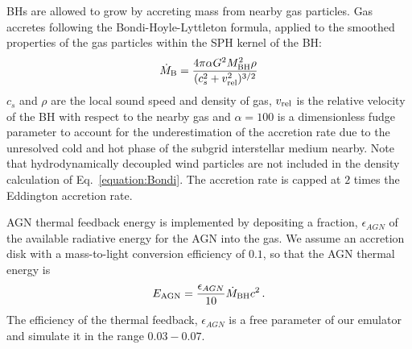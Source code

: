 \documentclass[a4paper,11pt]{article}
\begin{document}
BHs are allowed to grow by accreting mass from nearby gas particles. Gas accretes following the Bondi-Hoyle-Lyttleton formula, applied to the smoothed properties of the gas particles within the SPH kernel of the BH:
\begin{equation}
\label{equation:Bondi}
    \dot{M}_{\rm B} = \frac{4 \pi \alpha G^2 M_{\rm BH}^2 \rho}{(c^2_s+v_{\rm rel}^2)^{3/2}}
\end{equation}
$c_s$ and $\rho$ are the local sound speed and density of gas, $v_{\rm rel}$ is the relative velocity of the BH with respect to the nearby gas and $\alpha = 100$ is a dimensionless fudge parameter to account for the underestimation of the accretion rate due to the unresolved cold and hot phase of the subgrid interstellar medium nearby.
Note that hydrodynamically decoupled wind particles are not included in the density calculation of Eq.~\ref{equation:Bondi}. The accretion rate is capped at $2$ times the Eddington accretion rate.

AGN thermal feedback energy is implemented by depositing a fraction, $\epsilon_{AGN}$ of the available radiative energy for the AGN into the gas. We assume an accretion disk with a mass-to-light conversion efficiency of $0.1$, so that the AGN thermal energy is \cite{Shakura:1973}
\begin{equation}
\label{equation:Lbol}
    E_\mathrm{AGN} = \frac{\epsilon_{AGN}}{10} \dot{M}_{\rm BH} c^2\,.
\end{equation}
The efficiency of the thermal feedback, $\epsilon_{AGN}$ is a free parameter of our emulator and simulate it in the range $0.03 - 0.07$.
\end{document}
